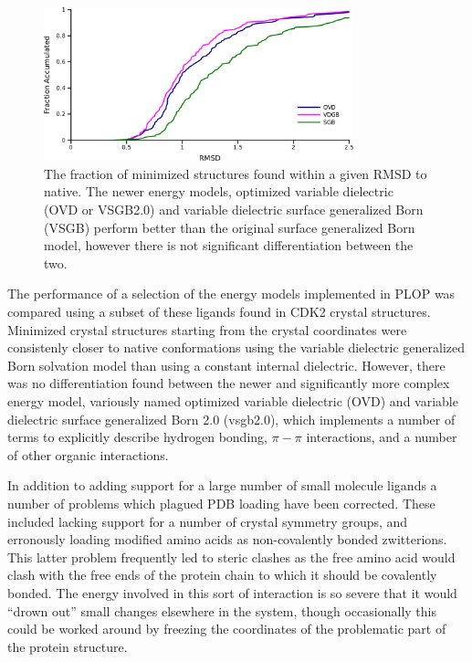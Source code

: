 \begin{figure}[h]
\centering
\includegraphics[width=0.8\textwidth]{figures/small_molecule_minimization.png}
\caption{The fraction of minimized structures found within a given RMSD to native.
The newer energy models, optimized variable dielectric (OVD or VSGB2.0) and variable dielectric surface generalized Born (VSGB) perform better than the original surface generalized Born model, however there is not significant differentiation between the two.}
\label{figure:small_molecule_minimization}
\end{figure}

The performance of a selection of the energy models implemented in PLOP was compared using a subset of these ligands found in CDK2 crystal structures.
Minimized crystal structures starting from the crystal coordinates were consistenly closer to native conformations using the variable dielectric generalized Born solvation model than using a constant internal dielectric.
However, there was no differentiation found between the newer and significantly more complex energy model, variously named optimized variable dielectric (OVD) and variable dielectric surface generalized Born 2.0 (vsgb2.0), which implements a number of terms to explicitly describe hydrogen bonding, $\pi-\pi$ interactions, and a number of other organic interactions.

In addition to adding support for a large number of small molecule ligands a number of problems which plagued PDB loading have been corrected.
These included lacking support for a number of crystal symmetry groups, and erronously loading modified amino acids as non-covalently bonded zwitterions.
This latter problem frequently led to steric clashes as the free amino acid would clash with the free ends of the protein chain to which it should be covalently bonded.
The energy involved in this sort of interaction is so severe that it would ``drown out'' small changes elsewhere in the system, though occasionally this could be worked around by freezing the coordinates of the problematic part of the protein structure.
